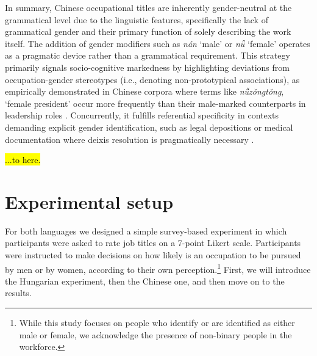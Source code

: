 \documentclass[11pt]{article}
\newcommand{\zh}[1]{\simplifiedchinesefont{#1}\rmfamily}
\begin{document}
In summary, Chinese occupational titles are inherently gender-neutral at the grammatical level due to the linguistic features, specifically the lack of grammatical gender and their primary function of solely describing the work itself. The addition of gender modifiers such as \zh{男} \textit{nán} `male' or \zh{女} \textit{nǚ} `female' operates as a pragmatic device rather than a grammatical requirement. This strategy primarily signals socio-cognitive markedness by highlighting deviations from occupation-gender stereotypes (i.e., denoting non-prototypical associations), as empirically demonstrated in Chinese corpora where terms like \zh{女总统} \textit{nǚzǒngtǒng}, `female president' occur more frequently than their male-marked counterparts in leadership roles \citep{su_2021_occupational,farris_1988_gender}. Concurrently, it fulfills referential specificity in contexts demanding explicit gender identification, such as legal depositions or medical documentation where deixis resolution is pragmatically necessary \citep{hellinger_2003_gender,stahlberg_2011_representation}.

\hl{...to here.}



\section{Experimental setup}\label{sec:experiment_setup}

For both languages we designed a simple survey-based experiment in which participants were asked to rate job titles on a 7-point Likert scale.
Participants were instructed to make decisions on how likely is an occupation to be pursued by men or by women, according to their own perception.\footnote{While this study focuses on people who identify or are identified as either male or female, we acknowledge the presence of non-binary people in the workforce.} First, we will introduce the Hungarian experiment, then the Chinese one, and then move on to the results.
\end{document}
